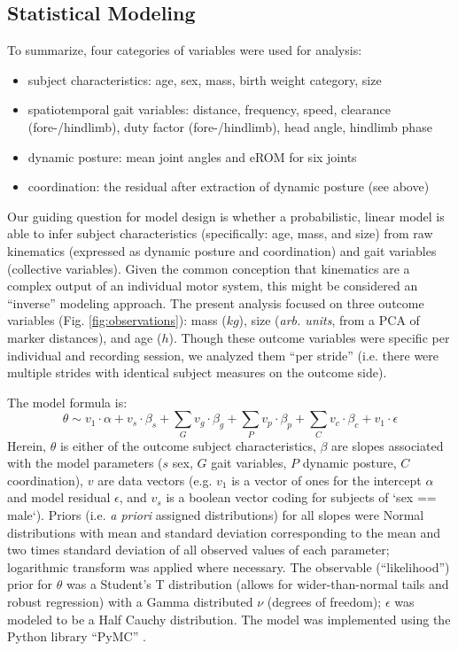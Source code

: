 \documentclass[10pt,a4paper]{article}
\begin{document}
\subsection{Statistical Modeling}
\label{sec:org7326405}
To summarize, four categories of variables were used for analysis:
\begin{itemize}
\item subject characteristics: age, sex, mass, birth weight category, size
\item spatiotemporal gait variables: distance, frequency, speed, clearance (fore-/hindlimb), duty factor (fore-/hindlimb), head angle, hindlimb phase
\item dynamic posture: mean joint angles and eROM for six joints
\item coordination: the residual after extraction of dynamic posture (see above)
\end{itemize}

Our guiding question for model design is whether a probabilistic, linear model is able to infer subject characteristics (specifically: age, mass, and size) from raw kinematics (expressed as dynamic posture and coordination) and gait variables (collective variables).
Given the common conception that kinematics are a complex output of an individual motor system, this might be considered an ``inverse'' modeling approach.
The present analysis focused on three outcome variables (Fig. \ref{fig:observations}): mass (\(kg\)), size (\emph{arb. units}, from a PCA of marker distances), and age (\(h\)).
Though these outcome variables were specific per individual and recording session, we analyzed them ``per stride'' (i.e. there were multiple strides with identical subject measures on the outcome side).


The model formula is:
\begin{equation} \theta \sim v_{1}\cdot\alpha + v_{s}\cdot\beta_{s} + \sum\limits_{G} v_{g}\cdot\beta_{g} + \sum\limits_{P}  v_{p}\cdot\beta_{p} +  \sum\limits_{C} v_{c}\cdot\beta_{c} + v_{1}\cdot\epsilon \label{eq:model} \end{equation}
Herein, \(\theta\) is either of the outcome subject characteristics, \(\beta\) are slopes associated with the model parameters (\(s\) sex, \(G\) gait variables, \(P\) dynamic posture, \(C\) coordination), \(v\) are data vectors (e.g. \(v_{1}\) is a vector of ones for the intercept \(\alpha\) and model residual \(\epsilon\), and \(v_{s}\) is a boolean vector coding for subjects of `sex == male`).
Priors (i.e. \emph{a priori} assigned distributions) for all slopes were Normal distributions with mean and standard deviation corresponding to the mean and two times standard deviation of all observed values of each parameter; logarithmic transform was applied where necessary.
The observable (``likelihood'') prior for \(\theta\) was a Student's T distribution (allows for wider-than-normal tails and robust regression) with a Gamma distributed \(\nu\) (degrees of freedom); \(\epsilon\) was modeled to be a Half Cauchy distribution.
The model was implemented using the Python library ``PyMC'' \citep[version 4.2.2,][]{Salvatier2016}.
\end{document}
